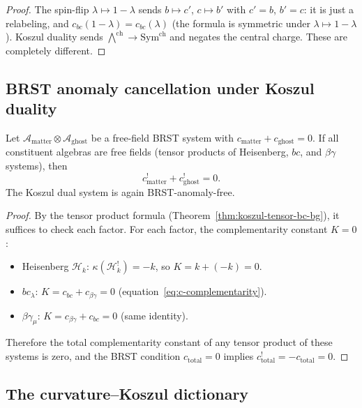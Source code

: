 \documentclass[11pt]{article}
\newcommand{\cA}{\mathcal{A}}
\newcommand{\cH}{\mathcal{H}}
\begin{document}
\begin{proof}
The spin-flip $\lambda \mapsto 1 - \lambda$ sends $b \mapsto c'$,
$c \mapsto b'$ with $c' = b$, $b' = c$: it is just a relabeling,
and $c_{bc}(1-\lambda) = c_{bc}(\lambda)$ (the formula is symmetric
under $\lambda \mapsto 1 - \lambda$).  Koszul duality sends
$\bigwedge^{\mathrm{ch}} \to \mathrm{Sym}^{\mathrm{ch}}$ and
negates the central charge.  These are completely different.
\end{proof}

\subsection{BRST anomaly cancellation under Koszul duality}

\begin{theorem}
\label{thm:brst-koszul-preservation}
Let $\cA_{\mathrm{matter}} \otimes \cA_{\mathrm{ghost}}$ be a
free-field BRST system with $c_{\mathrm{matter}} +
c_{\mathrm{ghost}} = 0$.  If all constituent algebras are
free fields (tensor products of Heisenberg, $bc$, and
$\beta\gamma$ systems), then
\[
c_{\mathrm{matter}}^! + c_{\mathrm{ghost}}^! = 0.
\]
The Koszul dual system is again BRST-anomaly-free.
\end{theorem}

\begin{proof}
By the tensor product formula
(Theorem~\ref{thm:koszul-tensor-bc-bg}), it suffices to check
each factor.  For each factor, the complementarity constant
$K = 0$:
\begin{itemize}[nosep]
\item Heisenberg $\cH_k$: $\kappa(\cH_k^!) = -k$, so
  $K = k + (-k) = 0$.
\item $bc_\lambda$: $K = c_{bc} + c_{\beta\gamma} = 0$
  (equation~\eqref{eq:c-complementarity}).
\item $\beta\gamma_\mu$: $K = c_{\beta\gamma} + c_{bc} = 0$
  (same identity).
\end{itemize}
Therefore the total complementarity constant of any tensor
product of these systems is zero, and the BRST condition
$c_{\mathrm{total}} = 0$ implies
$c_{\mathrm{total}}^! = -c_{\mathrm{total}} = 0$.
\end{proof}

\subsection{The curvature--Koszul dictionary}
\end{document}
